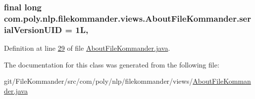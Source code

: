 \hypertarget{classcom_1_1poly_1_1nlp_1_1filekommander_1_1views_1_1_about_file_kommander_a3d338ec3ae32777a71f45c76b80cb59d}{
\subsubsection[{serial\-Version\-U\-I\-D}]{\setlength{\rightskip}{0pt plus 5cm}final long com.\-poly.\-nlp.\-filekommander.\-views.\-About\-File\-Kommander.\-serial\-Version\-U\-I\-D = 1\-L\hspace{0.3cm}{\ttfamily [static]}, {\ttfamily [private]}}}\label{classcom_1_1poly_1_1nlp_1_1filekommander_1_1views_1_1_about_file_kommander_a3d338ec3ae32777a71f45c76b80cb59d}


Definition at line \hyperlink{L29}{29} of file \hyperlink{}{About\-File\-Kommander.\-java}.



The documentation for this class was generated from the following file\-:\begin{DoxyCompactItemize}
\item 
git/\-File\-Kommander/src/com/poly/nlp/filekommander/views/\hyperlink{_about_file_kommander_8java}{About\-File\-Kommander.\-java}\end{DoxyCompactItemize}

